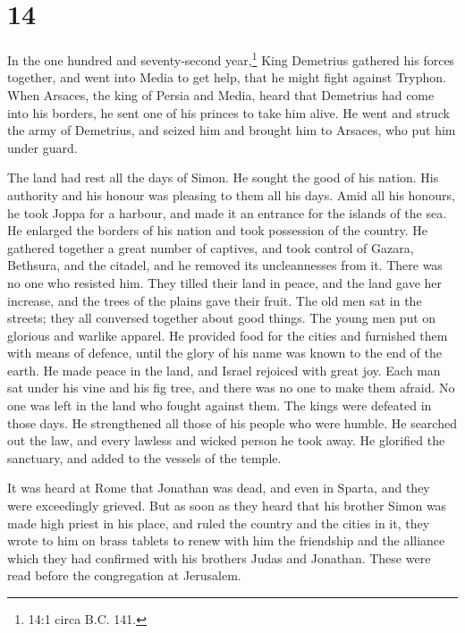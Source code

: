\hypertarget{section-13}{%
\section{14}\label{section-13}}

 In the one hundred and seventy-second year,\footnote{14:1
  circa B.C. 141.} King Demetrius gathered his forces together, and went
into Media to get help, that he might fight against Tryphon.
 When Arsaces, the king of Persia and Media, heard that
Demetrius had come into his borders, he sent one of his princes to take
him alive.  He went and struck the army of Demetrius, and
seized him and brought him to Arsaces, who put him under guard.

 The land had rest all the days of Simon. He sought the good
of his nation. His authority and his honour was pleasing to them all his
days.  Amid all his honours, he took Joppa for a harbour,
and made it an entrance for the islands of the sea.  He
enlarged the borders of his nation and took possession of the country.
 He gathered together a great number of captives, and took
control of Gazara, Bethsura, and the citadel, and he removed its
uncleannesses from it. There was no one who resisted him. 
They tilled their land in peace, and the land gave her increase, and the
trees of the plains gave their fruit.  The old men sat in
the streets; they all conversed together about good things. The young
men put on glorious and warlike apparel.  He provided food
for the cities and furnished them with means of defence, until the glory
of his name was known to the end of the earth.  He made
peace in the land, and Israel rejoiced with great joy. 
Each man sat under his vine and his fig tree, and there was no one to
make them afraid.  No one was left in the land who fought
against them. The kings were defeated in those days.  He
strengthened all those of his people who were humble. He searched out
the law, and every lawless and wicked person he took away. 
He glorified the sanctuary, and added to the vessels of the temple.

 It was heard at Rome that Jonathan was dead, and even in
Sparta, and they were exceedingly grieved.  But as soon as
they heard that his brother Simon was made high priest in his place, and
ruled the country and the cities in it,  they wrote to him
on brass tablets to renew with him the friendship and the alliance which
they had confirmed with his brothers Judas and Jonathan. 
These were read before the congregation at Jerusalem.

